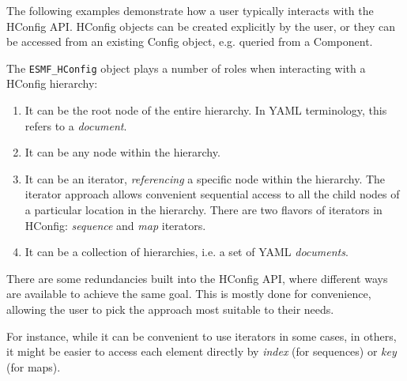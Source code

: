 
The following examples demonstrate how a user typically interacts with the
HConfig API. HConfig objects can be created explicitly by the user, or they
can be accessed from an existing Config object, e.g. queried from a Component.

The {\tt ESMF\_HConfig} object plays a number of roles when interacting with
a HConfig hierarchy:
\begin{enumerate}
\item It can be the root node of the entire hierarchy. In YAML terminology, this
refers to a {\em document}.
\item It can be any node within the hierarchy.
\item It can be an iterator, {\em referencing} a specific node within the
hierarchy. The iterator approach allows convenient sequential access to all
the child nodes of a particular location in the hierarchy. There are two flavors
of iterators in HConfig: {\em sequence} and {\em map} iterators.
\item It can be a collection of hierarchies, i.e. a set of YAML {\em documents}.
\end{enumerate}

There are some redundancies built into the HConfig API, where different ways
are available to achieve the same goal. This is mostly done for convenience,
allowing the user to pick the approach most suitable to their needs.

For instance, while it can be convenient to use iterators in some cases, in
others, it might be easier to access each element directly by {\em index}
(for sequences) or {\em key} (for maps).
